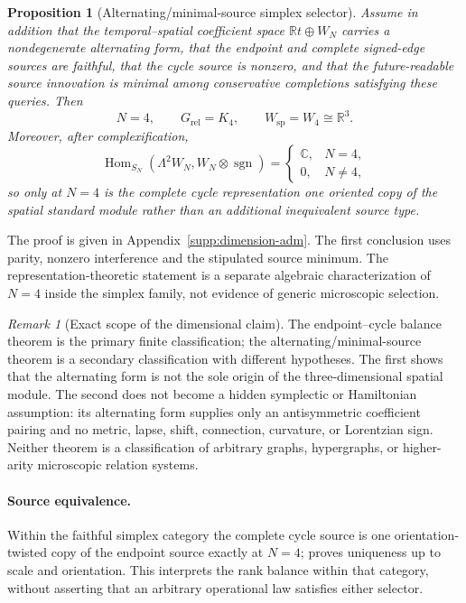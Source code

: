 \documentclass[11pt]{article}
\numberwithin{equation}{section}
\newtheorem{proposition}[proposition]{Proposition}
\theoremstyle{definition}
\theoremstyle{remark}
\newtheorem{remark}[remark]{Remark}
\newcommand{\R}{\mathbb R}
\newcommand{\C}{\mathbb C}
\newcommand{\Hom}{\operatorname{Hom}}
\begin{document}
\begin{proposition}[Alternating/minimal-source simplex selector]
\label{prop:main-alternating-k4}
Assume in addition that the temporal--spatial coefficient space
$\R t\oplus W_N$ carries a nondegenerate alternating form, that the endpoint
and complete signed-edge sources are faithful, that the cycle source is
nonzero, and that the future-readable source innovation is minimal among
conservative completions satisfying these queries.  Then
\begin{equation}
 N=4,\qquad G_{\mathrm{rel}}=K_4,
 \qquad W_{\mathrm{sp}}=W_4\cong\R^3.
 \label{eq:k4-main}
\end{equation}
Moreover, after complexification,
\begin{equation}
 \Hom_{S_N}(\Lambda^2W_N,W_N\otimes\operatorname{sgn})
 =\begin{cases}\C,&N=4,\\0,&N\ne4,\end{cases}
 \label{eq:main-oriented-copy}
\end{equation}
so only at $N=4$ is the complete cycle representation one oriented copy of the
spatial standard module rather than an additional inequivalent source type.
\end{proposition}

The proof is given in Appendix~\ref{supp:dimension-adm}.  The first conclusion
uses parity, nonzero interference and the stipulated source minimum. The
representation-theoretic statement is a separate algebraic characterization
of $N=4$ inside the simplex family, not evidence of generic microscopic selection.

\begin{remark}[Exact scope of the dimensional claim]
\label{rem:main-dimension-scope}
The endpoint--cycle balance theorem is the primary finite classification;
the alternating/minimal-source theorem is a secondary classification with
different hypotheses.  The first
shows that the alternating form is not the sole origin of the three-dimensional
spatial module.  The second does not become a hidden symplectic or Hamiltonian
assumption: its alternating form supplies only an antisymmetric coefficient
pairing and no metric, lapse, shift, connection, curvature, or Lorentzian sign.
Neither theorem is a classification of arbitrary graphs, hypergraphs, or
higher-arity microscopic relation systems.
\end{remark}

\paragraph{Source equivalence.}
Within the faithful simplex category the complete cycle source is one
orientation-twisted copy of the endpoint source exactly at $N=4$;
 proves uniqueness up to scale and
orientation. This interprets the rank balance within that category, without
asserting that an arbitrary operational law satisfies either selector.
\end{document}
